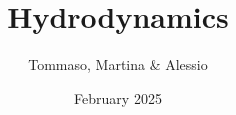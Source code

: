 \documentclass{report}
\title{Hydrodynamics}
\author{Tommaso, Martina \& Alessio}
\date{February 2025}
\begin{document}
\maketitle

\tableofcontents{\LARGE}
\newpage


\clearpage

\clearpage

\clearpage


\printbibliography
\end{document}
